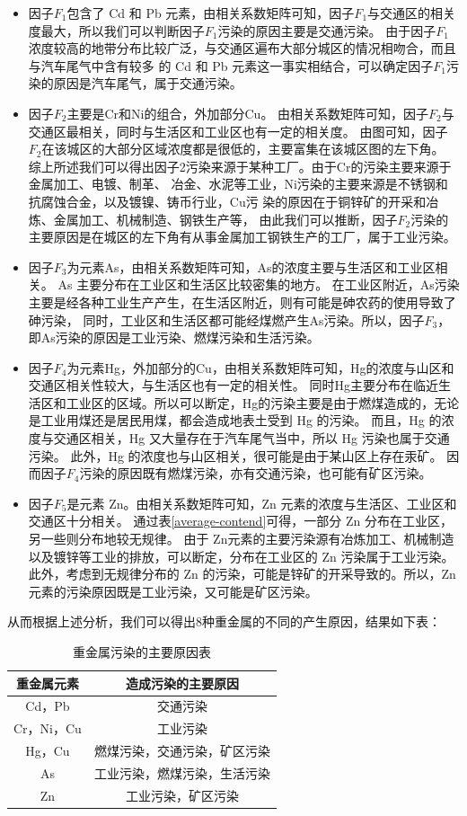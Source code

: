 \documentclass[a4paper]{article}
\begin{document}
\begin{itemize}
\item 因子$F_1$包含了 Cd 和 Pb 元素，由相关系数矩阵可知，因子$F_1$与交通区的相关度最大，所以我们可以判断因子$F_1$污染的原因主要是交通污染。
由于因子$F_1$浓度较高的地带分布比较广泛，与交通区遍布大部分城区的情况相吻合，而且与汽车尾气中含有较多
的 Cd 和 Pb 元素这一事实相结合，可以确定因子$F_1$污染的原因是汽车尾气，属于交通污染。  
\item 因子$F_2$主要是Cr和Ni的组合，外加部分Cu。 
由相关系数矩阵可知，因子$F_2$与交通区最相关，同时与生活区和工业区也有一定的相关度。 
由图可知，因子$F_2$在该城区的大部分区域浓度都是很低的，主要富集在该城区图的左下角。
综上所述我们可以得出因子2污染来源于某种工厂。由于Cr的污染主要来源于金属加工、电镀、制革、
冶金、水泥等工业，Ni污染的主要来源是不锈钢和抗腐蚀合金，以及镀镍、铸币行业，Cu污
染的原因在于铜锌矿的开采和冶炼、金属加工、机械制造、钢铁生产等，
由此我们可以推断，因子$F_2$污染的主要原因是在城区的左下角有从事金属加工钢铁生产的工厂，属于工业污染。
\item 因子$F_3$为元素As，由相关系数矩阵可知，As的浓度主要与生活区和工业区相关。
As 主要分布在工业区和生活区比较密集的地方。
在工业区附近，As污染主要是经各种工业生产产生，在生活区附近，则有可能是砷农药的使用导致了砷污染，
同时，工业区和生活区都可能经煤燃产生As污染。所以，因子$F_3$，即As污染的原因是工业污染、燃煤污染和生活污染。    
\item 因子$F_4$为元素Hg，外加部分的Cu，由相关系数矩阵可知，Hg的浓度与山区和交通区相关性较大，与生活区也有一定的相关性。
同时Hg主要分布在临近生活区和工业区的区域。所以可以断定，Hg的污染主要是由于燃煤造成的，无论是工业用煤还是居民用煤，都会造成地表土受到 Hg 的污染。
而且，Hg 的浓度与交通区相关，Hg 又大量存在于汽车尾气当中，所以 Hg 污染也属于交通污染。
此外，Hg 的浓度也与山区相关，很可能是由于某山区上存在汞矿。
因而因子$F_4$污染的原因既有燃煤污染，亦有交通污染，也可能有矿区污染。    
\item 因子$F_5$是元素 Zn。由相关系数矩阵可知，Zn 元素的浓度与生活区、工业区和交通区十分相关。
通过表\ref{average-contend}可得，一部分 Zn 分布在工业区，另一些则分布地较无规律。
由于 Zn元素的主要污染源有冶炼加工、机械制造以及镀锌等工业的排放，可以断定，分布在工业区的 Zn 污染属于工业污染。
此外，考虑到无规律分布的 Zn 的污染，可能是锌矿的开采导致的。所以，Zn 元素的污染原因既是工业污染，又可能是矿区污染。
\end{itemize}
\indent 从而根据上述分析，我们可以得出8种重金属的不同的产生原因，结果如下表：
\begin{table}[H]
		\centering
		\caption{重金属污染的主要原因表}
		\label{main-reason}
		\begin{tabular}{|c|c|}
		\hline
			重金属元素	  &  造成污染的主要原因 \\
			\hline
			Cd，Pb  &    交通污染  \\  \hline
			Cr，Ni，Cu  &    工业污染 \\ \hline
			Hg，Cu   &   燃煤污染，交通污染，矿区污染 \\ \hline
			As   &	工业污染，燃煤污染，生活污染  \\ \hline
			Zn  &     工业污染，矿区污染        \\ \hline
		\end{tabular}
\end{table}
\end{document}
